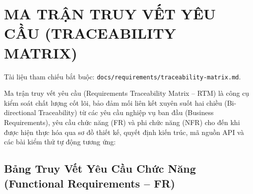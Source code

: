 \documentclass[11pt,a4paper]{article}
\begin{document}
\section{MA TRẬN TRUY VẾT YÊU CẦU (TRACEABILITY MATRIX)}

Tài liệu tham chiếu bắt buộc: \texttt{docs/requirements/traceability-matrix.md}.

Ma trận truy vết yêu cầu (Requirements Traceability Matrix -- RTM) là công cụ kiểm soát chất lượng cốt lõi, bảo đảm mối liên kết xuyên suốt hai chiều (Bi-directional Traceability) từ các yêu cầu nghiệp vụ ban đầu (Business Requirements), yêu cầu chức năng (FR) và phi chức năng (NFR) cho đến khi được hiện thực hóa qua sơ đồ thiết kế, quyết định kiến trúc, mã nguồn API và các bài kiểm thử tự động tương ứng:
\clearpage

\subsection{Bảng Truy Vết Yêu Cầu Chức Năng (Functional Requirements -- FR)}
\end{document}
